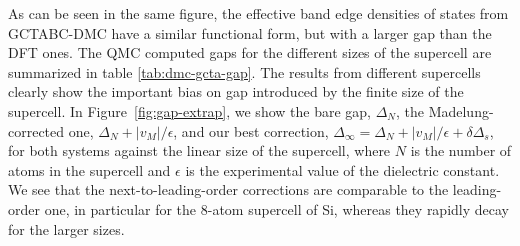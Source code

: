 As can be seen in the same figure, the effective band edge densities of states from GCTABC-DMC
have a similar functional form, but with a larger gap than the DFT ones.
The QMC computed gaps
for the different sizes of the supercell are summarized in table \ref{tab:dmc-gcta-gap}.
The results from different supercells clearly show the important bias 
on gap introduced by the finite size of the supercell. In Figure~\ref{fig:gap-extrap}, we show the bare gap, $\Delta_N$, the Madelung-corrected one, $\Delta_N+|v_M|/\epsilon$, and our best correction, $\Delta_\infty=\Delta_N+|v_M|/\epsilon+\delta \Delta_s$, for both systems against the linear size of the supercell, where $N$ is the number of atoms in the supercell and $\epsilon$ is the experimental value of the dielectric constant.
We see that the next-to-leading-order corrections are 
comparable to the leading-order one, in particular for the 8-atom supercell of Si,
whereas they rapidly decay for the larger sizes. 


